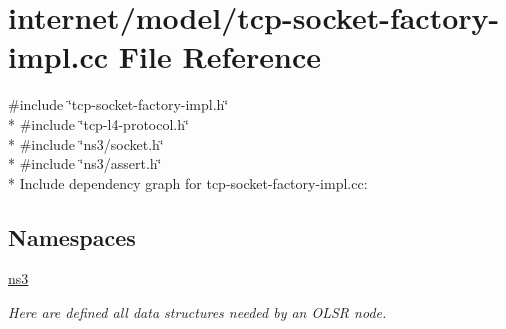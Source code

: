 \hypertarget{tcp-socket-factory-impl_8cc}{}\section{internet/model/tcp-\/socket-\/factory-\/impl.cc File Reference}
\label{tcp-socket-factory-impl_8cc}
{\ttfamily \#include \char`\"{}tcp-\/socket-\/factory-\/impl.\+h\char`\"{}}\\*
{\ttfamily \#include \char`\"{}tcp-\/l4-\/protocol.\+h\char`\"{}}\\*
{\ttfamily \#include \char`\"{}ns3/socket.\+h\char`\"{}}\\*
{\ttfamily \#include \char`\"{}ns3/assert.\+h\char`\"{}}\\*
Include dependency graph for tcp-\/socket-\/factory-\/impl.cc\+:
\subsection*{Namespaces}
\begin{DoxyCompactItemize}
\item 
 \hyperlink{namespacens3}{ns3}
\begin{DoxyCompactList}\small\item\em Here are defined all data structures needed by an O\+L\+SR node. \end{DoxyCompactList}\end{DoxyCompactItemize}
